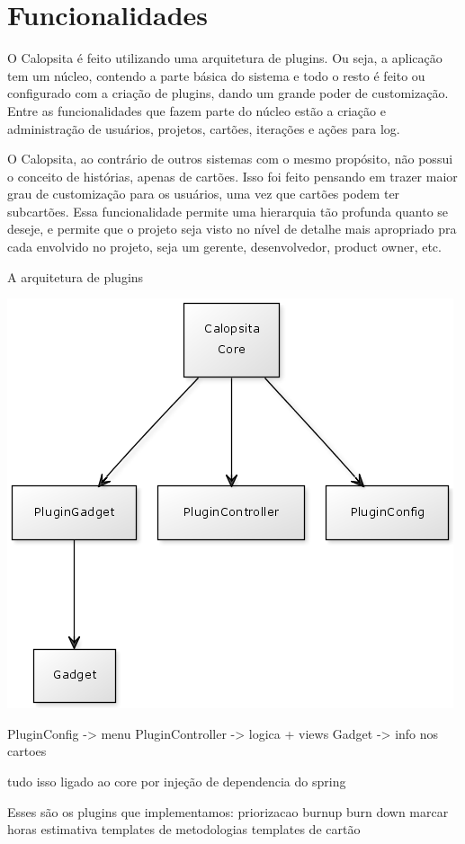 \section{Funcionalidades}

O Calopsita é feito utilizando uma arquitetura de plugins. Ou seja, a aplicação tem um núcleo, contendo a parte básica do sistema e todo o resto é feito ou configurado com a criação de plugins, dando um grande poder de customização.
Entre as funcionalidades que fazem parte do núcleo estão a criação e administração de usuários,
projetos, cartões, iterações e ações para log.

O Calopsita, ao contrário de outros sistemas com o mesmo propósito, não possui o conceito de histórias, apenas de cartões. Isso foi feito pensando em trazer maior grau de customização para os usuários, uma vez que cartões podem ter subcartões. Essa funcionalidade permite uma hierarquia tão profunda quanto se deseje, e permite que o projeto seja visto no nível de detalhe mais apropriado pra cada envolvido no projeto, seja um gerente, desenvolvedor, product owner, etc.

A arquitetura de plugins

\includegraphics{images/plugins_uml.png}

PluginConfig -> menu
PluginController -> logica + views
Gadget -> info nos cartoes

tudo isso ligado ao core por injeção de dependencia do spring


Esses são os plugins que implementamos:
priorizacao
burnup
burn down
marcar horas
estimativa
templates de metodologias
templates de cartão


